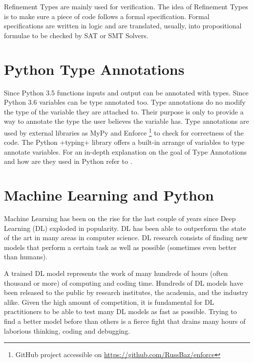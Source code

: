 Refinement Types \autocite{rushby_subtypes_1998} are mainly used for
verification. The idea of Refinement Types is to make sure a piece of
code follows a formal specification. Formal specifications are written
in logic and are translated, usually, into propositional formulae to be
checked by SAT or SMT Solvers.

\section{Python Type Annotations}\label{python-type-annotations}

Since Python 3.5 \autocite{pep484} functions inputs and output can be
annotated with types. Since Python 3.6 \autocite{pep526} variables can
be type annotated too. Type annotations do no modify the type of the
variable they are attached to. Their purpose is only to provide a way to
annotate the type the user believes the variable has. Type annotations
are used by external libraries as MyPy \autocite{lehtosalo2016mypy} and
Enforce \footnote{GitHub project accessible on
  \url{https://github.com/RussBaz/enforce}} to check for correctness of
the code. The Python \pycode+typing+ library offers a built-in arrange of
variables to type annotate variables. For an in-depth explanation on the
goal of Type Annotations and how are they used in Python refer to
\autocite{pep483}.

\section{Machine Learning and Python}%
\label{machine-learning-and-python}

Machine Learning has been on the rise for the last couple of years since
Deep Learning (DL) exploded in popularity. DL has been able to
outperform the state of the art in many areas in computer science. DL
research consists of finding new models that perform a certain task as
well as possible (sometimes even better than humans).

A trained DL model represents the work of many hundreds of hours (often
thousand or more) of computing and coding time. Hundreds of DL models
have been released to the public by research institutes, the academia,
and the industry alike. Given the high amount of competition, it is
fundamental for DL practitioners to be able to test many DL models as
fast as possible. Trying to find a better model before than others is a
fierce fight that drains many hours of laborious thinking, coding and
debugging.

